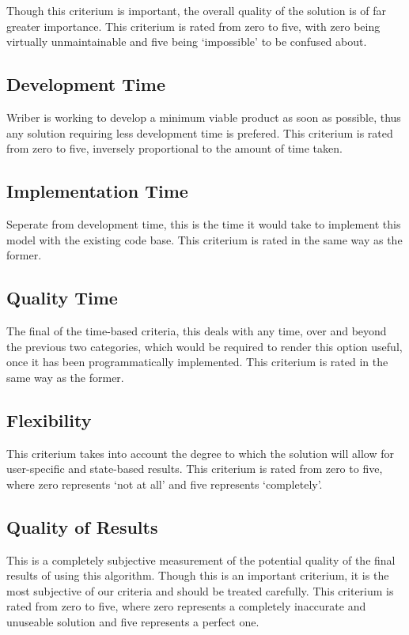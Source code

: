 \documentclass[12pt]{article}
\begin{document}
Though this criterium is important, the overall quality of the solution is of far greater importance. This criterium is rated from zero to five, with zero being virtually unmaintainable and five being `impossible' to be confused about.

\subsection{Development Time}
Wriber is working to develop a minimum viable product as soon as possible, thus any solution requiring less development time is prefered. This criterium is rated from zero to five, inversely proportional to the amount of time taken.

\subsection{Implementation Time}
Seperate from development time, this is the time it would take to implement this model with the existing code base. This criterium is rated in the same way as the former.

\subsection{Quality Time}
The final of the time-based criteria, this deals with any time, over and beyond the previous two categories, which would be required to render this option useful, once it has been programmatically implemented. This criterium is rated in the same way as the former.

\subsection{Flexibility}
This criterium takes into account the degree to which the solution will allow for user-specific and state-based results. This criterium is rated from zero to five, where zero represents `not at all' and five represents `completely'.

\subsection{Quality of Results}
This is a completely subjective measurement of the potential quality of the final results of using this algorithm. Though this is an important criterium, it is the most subjective of our criteria and should be treated carefully. This criterium is rated from zero to five, where zero represents a completely inaccurate and unuseable solution and five represents a perfect one.
\newpage
\end{document}
